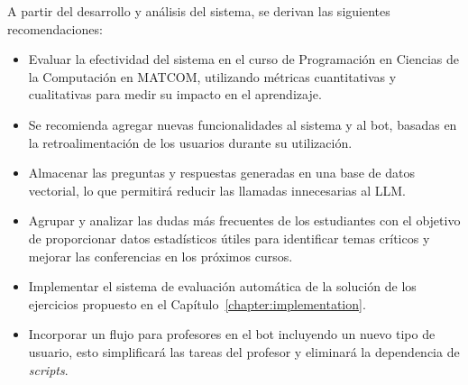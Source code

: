 \begin{recomendations}
    A partir del desarrollo y análisis del sistema, se derivan las siguientes recomendaciones:

    \begin{itemize}
        \item Evaluar la efectividad del sistema en el curso de Programación en Ciencias de la Computación en \mbox{MATCOM}, utilizando métricas cuantitativas y cualitativas para medir su impacto en el aprendizaje.
        
        \item Se recomienda agregar nuevas funcionalidades al sistema y al bot, basadas en la retroalimentación de los usuarios durante su utilización.
        
        \item Almacenar las preguntas y respuestas generadas en una base de datos vectorial, lo que permitirá reducir las llamadas innecesarias al LLM.
    
        \item Agrupar y analizar las dudas más frecuentes de los estudiantes con el objetivo de proporcionar datos estadísticos útiles para identificar temas críticos y mejorar las conferencias en los próximos cursos.
        
        \item Implementar el sistema de evaluación automática de la solución de los ejercicios propuesto en el Capítulo~\ref{chapter:implementation}.
        
        \item Incorporar un flujo para profesores en el bot incluyendo un nuevo tipo de usuario, esto simplificará las tareas del profesor y eliminará la dependencia de \textit{scripts}.
    \end{itemize}
\end{recomendations}

